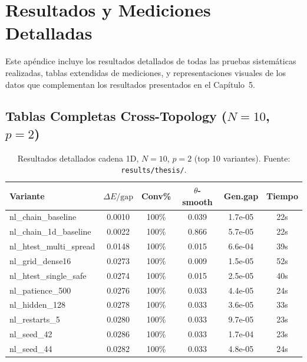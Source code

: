 \documentclass[11pt,a4paper,spanish]{book}
\begin{document}

\appendix

\chapter{Resultados y Mediciones Detalladas}
\label{app:resultados}

Este apéndice incluye los resultados detallados de todas las pruebas sistemáticas realizadas, tablas extendidas de mediciones, y representaciones visuales de los datos que complementan los resultados presentados en el Capítulo~5.

\section{Tablas Completas Cross-Topology ($N = 10$, $p = 2$)}

\begin{table}[h]
\centering
\caption{Resultados detallados cadena 1D, $N = 10$, $p = 2$ (top 10 variantes). Fuente: \texttt{results/thesis/}.}
\label{tab:app_chain}
\begin{tabular}{lccccc}
\toprule
\textbf{Variante} & \textbf{$\Delta E/\text{gap}$} & \textbf{Conv\%} & \textbf{$\theta$-smooth} & \textbf{Gen.gap} & \textbf{Tiempo} \\
\midrule
nl\_chain\_baseline & 0.0010 & 100\% & 0.039 & 1.7e-05 & 22s \\
nl\_chain\_1d\_baseline & 0.0022 & 100\% & 0.866 & 5.7e-05 & 22s \\
nl\_htest\_multi\_spread & 0.0148 & 100\% & 0.015 & 6.6e-04 & 39s \\
nl\_grid\_dense16 & 0.0273 & 100\% & 0.009 & 1.5e-05 & 52s \\
nl\_htest\_single\_safe & 0.0274 & 100\% & 0.015 & 2.5e-05 & 40s \\
nl\_patience\_500 & 0.0276 & 100\% & 0.033 & 4.4e-05 & 24s \\
nl\_hidden\_128 & 0.0278 & 100\% & 0.033 & 3.6e-05 & 33s \\
nl\_restarts\_5 & 0.0280 & 100\% & 0.033 & 9.7e-05 & 23s \\
nl\_seed\_42 & 0.0286 & 100\% & 0.033 & 1.7e-04 & 23s \\
nl\_seed\_44 & 0.0282 & 100\% & 0.033 & 4.8e-05 & 24s \\
\bottomrule
\end{tabular}
\end{table}
\end{document}
